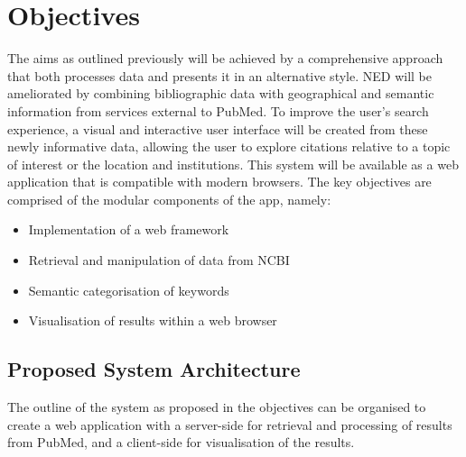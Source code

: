 \documentclass[PROP_AGutteridge_CS.tex]{subfiles}
\begin{document}
\chapter{Objectives}
The aims as outlined previously will be achieved by a comprehensive approach that both processes data and presents it in an alternative style. NED will be ameliorated by combining bibliographic data with geographical and semantic information from services external to PubMed. To improve the user's search experience, a visual and interactive user interface will be created from these newly informative data, allowing the user to explore citations relative to a topic of interest or the location and institutions. This system will be available as a web application that is compatible with modern browsers. The key objectives are comprised of the modular components of the app, namely:
\begin{itemize}
\item{Implementation of a web framework}
\item{Retrieval and manipulation of data from NCBI}
\item{Semantic categorisation of keywords}
\item{Visualisation of results within a web browser} 
\end{itemize}

\section{Proposed System Architecture}
The outline of the system as proposed in the objectives can be organised to create a web application with a server-side for retrieval and processing of results from PubMed, and a client-side for visualisation of the results. 
\end{document}
